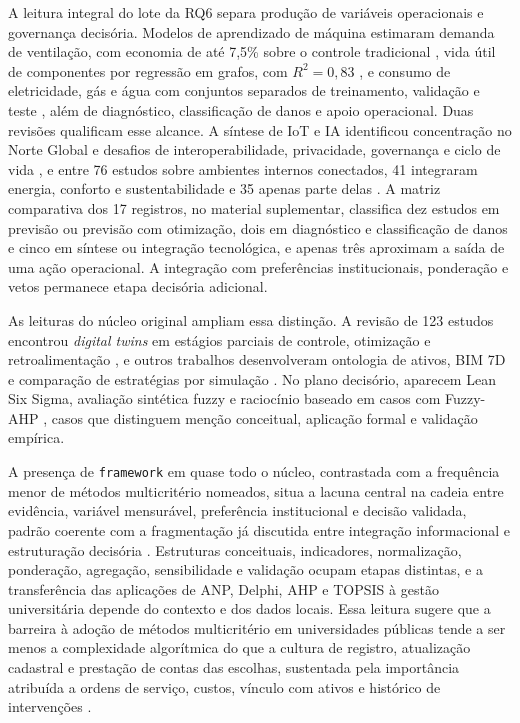 A leitura integral do lote da RQ6 separa produção de variáveis operacionais e governança decisória. Modelos de aprendizado de máquina estimaram demanda de ventilação, com economia de até 7,5\% sobre o controle tradicional \parencite{motuziene_ventilacaoia_2025}, vida útil de componentes por regressão em grafos, com $R^2=0{,}83$ \parencite{wu_gnnvidautil_2025}, e consumo de eletricidade, gás e água com conjuntos separados de treinamento, validação e teste \parencite{suh_demandaenergiaagua_2012}, além de diagnóstico, classificação de danos e apoio operacional. Duas revisões qualificam esse alcance. A síntese de IoT e IA identificou concentração no Norte Global e desafios de interoperabilidade, privacidade, governança e ciclo de vida \parencite{das_iotai_2025}, e entre 76 estudos sobre ambientes internos conectados, 41 integraram energia, conforto e sustentabilidade e 35 apenas parte delas \parencite{alici_iotambientes_2026}. A matriz comparativa dos 17 registros, no material suplementar, classifica dez estudos em previsão ou previsão com otimização, dois em diagnóstico e classificação de danos e cinco em síntese ou integração tecnológica, e apenas três aproximam a saída de uma ação operacional. A integração com preferências institucionais, ponderação e vetos permanece etapa decisória adicional.

As leituras do núcleo original ampliam essa distinção. A revisão de 123 estudos encontrou \textit{digital twins} em estágios parciais de controle, otimização e retroalimentação \parencite{deng_bimdigitaltwins_2021}, e outros trabalhos desenvolveram ontologia de ativos, BIM 7D e comparação de estratégias por simulação \parencite{gispert_ontologiaativos_2025,goretti_bimoem_2023,ferreira_manutencaoceramica_2020}. No plano decisório, aparecem Lean Six Sigma, avaliação sintética fuzzy e raciocínio baseado em casos com Fuzzy-AHP \parencite{aldairi_lean6sbm_2017,yoon_fuzzyfm_2018,park_cbrfuzzyahp_2019}, casos que distinguem menção conceitual, aplicação formal e validação empírica.

A presença de \texttt{framework} em quase todo o núcleo, contrastada com a frequência menor de métodos multicritério nomeados, situa a lacuna central na cadeia entre evidência, variável mensurável, preferência institucional e decisão validada, padrão coerente com a fragmentação já discutida entre integração informacional e estruturação decisória \parencite{deng_bimdigitaltwins_2021,das_iotai_2025}. Estruturas conceituais, indicadores, normalização, ponderação, agregação, sensibilidade e validação ocupam etapas distintas, e a transferência das aplicações de ANP, Delphi, AHP e TOPSIS à gestão universitária depende do contexto e dos dados locais. Essa leitura sugere que a barreira à adoção de métodos multicritério em universidades públicas tende a ser menos a complexidade algorítmica do que a cultura de registro, atualização cadastral e prestação de contas das escolhas, sustentada pela importância atribuída a ordens de serviço, custos, vínculo com ativos e histórico de intervenções \parencite{martins_custosmanutencaoses_2024,morais_eficienciamanutencao_2023}.

